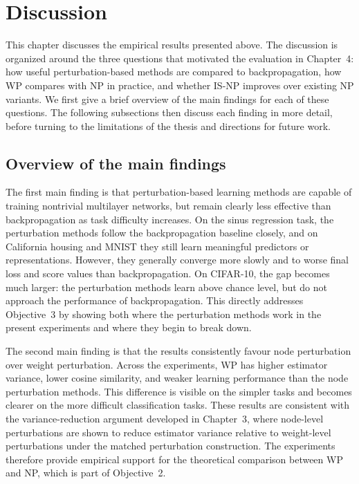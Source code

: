 \section{Discussion}
\label{ch:discussion}
This chapter discusses the empirical results presented above. The discussion is organized around the three questions that motivated the evaluation in Chapter~4: how useful perturbation-based methods are compared to backpropagation, how WP compares with NP in practice, and whether IS-NP improves over existing NP variants. We first give a brief overview of the main findings for each of these questions. The following subsections then discuss each finding in more detail, before turning to the limitations of the thesis and directions for future work.

\subsection{Overview of the main findings}

The first main finding is that perturbation-based learning methods are capable of training nontrivial multilayer networks, but remain clearly less effective than backpropagation as task difficulty increases. On the sinus regression task, the perturbation methods follow the backpropagation baseline closely, and on California housing and MNIST they still learn meaningful predictors or representations. However, they generally converge more slowly and to worse final loss and score values than backpropagation. On CIFAR-10, the gap becomes much larger: the perturbation methods learn above chance level, but do not approach the performance of backpropagation. This directly addresses Objective~3 by showing both where the perturbation methods work in the present experiments and where they begin to break down.

The second main finding is that the results consistently favour node perturbation over weight perturbation. Across the experiments, WP has higher estimator variance, lower cosine similarity, and weaker learning performance than the node perturbation methods. This difference is visible on the simpler tasks and becomes clearer on the more difficult classification tasks. These results are consistent with the variance-reduction argument developed in Chapter~3, where node-level perturbations are shown to reduce estimator variance relative to weight-level perturbations under the matched perturbation construction. The experiments therefore provide empirical support for the theoretical comparison between WP and NP, which is part of Objective~2.

